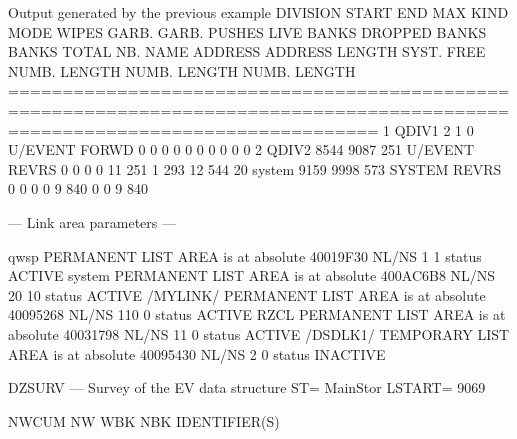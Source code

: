 \begin{landscapebody}
\begin{XMPt}{Output generated by the previous example}
   DIVISION    START    END       MAX    KIND   MODE  WIPES  GARB.  GARB. PUSHES      LIVE BANKS  DROPPED BANKS    BANKS TOTAL   
 NB.   NAME   ADDRESS ADDRESS  LENGTH                        SYST.   FREE         NUMB.   LENGTH NUMB.   LENGTH NUMB.   LENGTH   
==============================================================================================================================   
  1  QDIV1          2       1       0 U/EVENT  FORWD      0      0      0      0       0        0     0        0     0        0  
  2  QDIV2       8544    9087     251 U/EVENT  REVRS      0      0      0      0      11      251     1      293    12      544  
 20  system      9159    9998     573  SYSTEM  REVRS      0      0      0      0       9      840     0        0     9      840  
                                                                                                                                 
 --- Link area parameters ---                                                                                                    
                                                                                                                                 
qwsp     PERMANENT LIST AREA      is at absolute 40019F30 NL/NS     1    1     status   ACTIVE                                   
system   PERMANENT LIST AREA      is at absolute 400AC6B8 NL/NS    20   10     status   ACTIVE                                   
/MYLINK/ PERMANENT LIST AREA      is at absolute 40095268 NL/NS   110    0     status   ACTIVE                                   
RZCL     PERMANENT LIST AREA      is at absolute 40031798 NL/NS    11    0     status   ACTIVE                                   
/DSDLK1/ TEMPORARY LIST AREA      is at absolute 40095430 NL/NS     2    0     status INACTIVE                                   
                                                                                                                                 
DZSURV --- Survey of the EV data structure                                                         ST= MainStor  LSTART=     9069
                                                                                                                                 
  NWCUM     NW   WBK  NBK    IDENTIFIER(S)                                                                                       
                                                                                                                                 

\end{XMPt}
\end{landscapebody}
